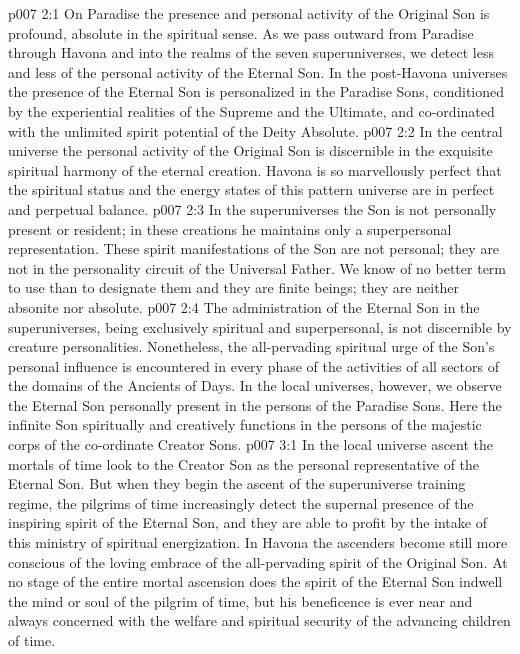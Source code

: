 \vs p007 2:1 On Paradise the presence and personal activity of the Original Son is profound, absolute in the spiritual sense. As we pass outward from Paradise through Havona and into the realms of the seven superuniverses, we detect less and less of the personal activity of the Eternal Son. In the post\hyp{}Havona universes the presence of the Eternal Son is personalized in the Paradise Sons, conditioned by the experiential realities of the Supreme and the Ultimate, and co\hyp{}ordinated with the unlimited spirit potential of the Deity Absolute.
\vs p007 2:2 In the central universe the personal activity of the Original Son is discernible in the exquisite spiritual harmony of the eternal creation. Havona is so marvellously perfect that the spiritual status and the energy states of this pattern universe are in perfect and perpetual balance.
\vs p007 2:3 In the superuniverses the Son is not personally present or resident; in these creations he maintains only a superpersonal representation. These spirit manifestations of the Son are not personal; they are not in the personality circuit of the Universal Father. We know of no better term to use than to designate them  and they are finite beings; they are neither absonite nor absolute.
\vs p007 2:4 The administration of the Eternal Son in the superuniverses, being exclusively spiritual and superpersonal, is not discernible by creature personalities. Nonetheless, the all\hyp{}pervading spiritual urge of the Son’s personal influence is encountered in every phase of the activities of all sectors of the domains of the Ancients of Days. In the local universes, however, we observe the Eternal Son personally present in the persons of the Paradise Sons. Here the infinite Son spiritually and creatively functions in the persons of the majestic corps of the co\hyp{}ordinate Creator Sons.
\vs p007 3:1 In the local universe ascent the mortals of time look to the Creator Son as the personal representative of the Eternal Son. But when they begin the ascent of the superuniverse training regime, the pilgrims of time increasingly detect the supernal presence of the inspiring spirit of the Eternal Son, and they are able to profit by the intake of this ministry of spiritual energization. In Havona the ascenders become still more conscious of the loving embrace of the all\hyp{}pervading spirit of the Original Son. At no stage of the entire mortal ascension does the spirit of the Eternal Son indwell the mind or soul of the pilgrim of time, but his beneficence is ever near and always concerned with the welfare and spiritual security of the advancing children of time.
